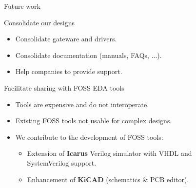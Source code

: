 \documentclass[compress,red]{beamer}
\begin{document}
\begin{frame}{Future work}

  \begin{block}{Consolidate our designs}
    \begin{itemize}
    \item Consolidate gateware and drivers. %
    \item Consolidate documentation (manuals, FAQs, ...).
    \item Help companies to provide support.
    \end{itemize}
  \end{block}

  \begin{block}{Facilitate sharing with FOSS EDA tools}
    \begin{itemize}
    \item Tools are expensive and do not interoperate.
    \item Existing FOSS tools not usable for complex designs.
    \item We contribute to the development of FOSS tools:
      \begin{itemize}
      \item Extension of \textbf{Icarus} Verilog simulator with VHDL and \\ SystemVerilog support.
      \item Enhancement of \textbf{KiCAD} (schematics \& PCB editor).
      \end{itemize}
    \end{itemize}
  \end{block}

  \note[item]{}

\end{frame}
\end{document}
